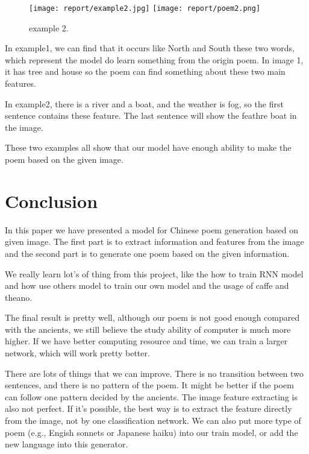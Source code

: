 \documentclass[10pt,twocolumn,letterpaper]{article}
\begin{document}
\begin{figure}[t]
\begin{center}
   \texttt{[image: report/example2.jpg]}
   \texttt{[image: report/poem2.png]}
\end{center}
   \caption{example 2.}
\label{fig:example2}
\end{figure}

In example1, we can find that it occurs like North and South these two words, which represent the model do learn something from the origin poem. In image 1, it has tree and house so the poem can find something about these two main features.

In example2, there is a river and a boat, and the weather is fog, so the first sentence contains these feature. The last sentence will show the feathre boat in the image. 

These two examples all show that our model have enough ability to make the poem based on the given image.

\section{Conclusion}
    In this paper we have presented a model for Chinese poem generation based on given image. The first part is to extract information and features from the image and the second part is to generate one poem based on the given information. 

    We really learn lot's of thing from this project, like the how to train RNN model and how use others model to train our own model and the usage of caffe and theano.

    The final result is pretty well, although our poem is not good enough compared with the ancients, we still believe the study ability of computer is much more higher. If we have better computing resource and time, we can train a larger network, which will work pretty better.

    There are lots of things that we can improve. There is no transition between two sentences, and there is no pattern of the poem. It might be better if the poem can follow one pattern decided by the ancients. The image feature extracting is also not perfect. If it's possible, the best way is to extract the feature directly from the image, not by one classification network. We can also put more type of poem (e.g., Engish sonnets or Japanese haiku) into our train model, or add the new language into this generator.
\end{document}
